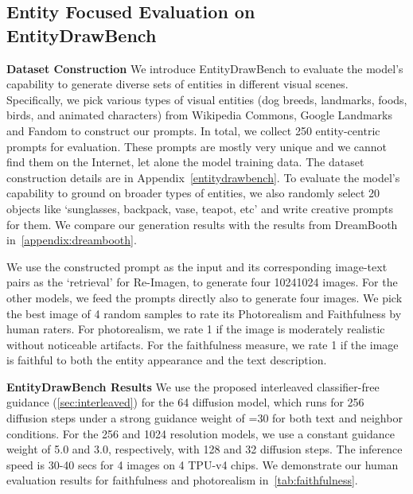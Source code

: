 \documentclass{article} \usepackage{iclr2023_conference,times}
\newcommand{\modelname}{{Re-Imagen}\xspace}
\begin{document}
\subsection{Entity Focused Evaluation on EntityDrawBench}
\noindent \textbf{Dataset Construction}
We introduce EntityDrawBench to evaluate the model's capability to generate diverse sets of entities in different visual scenes. Specifically, we pick various types of visual entities (dog breeds, landmarks, foods, birds, and animated characters) from Wikipedia Commons, Google Landmarks and Fandom to construct our prompts. In total, we collect 250 entity-centric prompts for evaluation. These prompts are mostly very unique and we cannot find them on the Internet, let alone the model training data. The dataset construction details are in Appendix~\ref{entitydrawbench}. To evaluate the model's capability to ground on broader types of entities, we also randomly select 20 objects like `sunglasses, backpack, vase, teapot, etc' and write creative prompts for them. We compare our generation results with the results from DreamBooth~\citep{ruiz2022dreambooth} in~\autoref{appendix:dreambooth}. 

We use the constructed prompt as the input and its corresponding image-text pairs as the `retrieval' for \modelname, to generate four 10241024 images. For the other models, we feed the prompts directly also to generate four images. We pick the best image of 4 random samples to rate its Photorealism and Faithfulness by human raters. For photorealism, we rate 1 if the image is moderately realistic without noticeable artifacts. For the faithfulness measure, we rate 1 if the image is faithful to both the entity appearance and the text description.

\noindent \textbf{EntityDrawBench Results}
We use the proposed interleaved classifier-free guidance (\autoref{sec:interleaved}) for the 64 diffusion model, which runs for 256 diffusion steps under a strong guidance weight of =30 for both text and neighbor conditions. For the 256 and 1024 resolution models, we use a constant guidance weight of 5.0 and 3.0, respectively, with 128 and 32 diffusion steps. The inference speed is 30-40 secs for 4 images on 4 TPU-v4 chips. We demonstrate our human evaluation results for faithfulness and photorealism in~\autoref{tab:faithfulness}.
\end{document}
